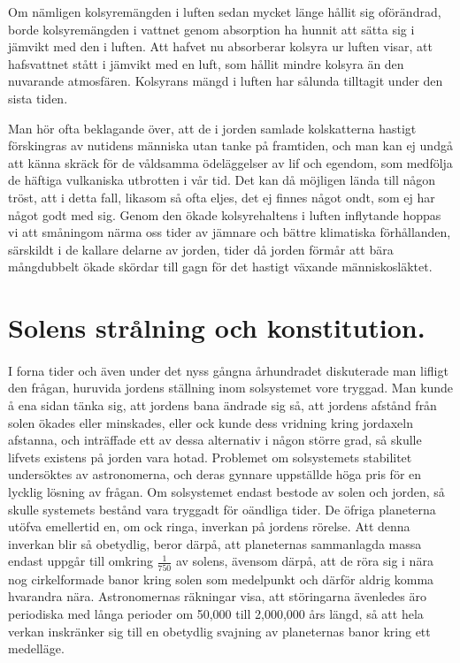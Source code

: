 \documentclass[a4paper, 12pt, oneside, swedish]{article}
\begin{document}
Om nämligen kolsyremängden i luften sedan mycket länge hållit sig oförändrad, borde kolsyremängden i vattnet genom absorption ha hunnit att sätta sig i jämvikt med den i luften. Att hafvet nu absorberar kolsyra ur luften visar, att hafsvattnet stått i jämvikt med en luft, som hållit mindre kolsyra än den nuvarande atmosfären. Kolsyrans mängd i luften har sålunda tilltagit under den sista tiden.

Man hör ofta beklagande över, att de i jorden samlade kolskatterna hastigt förskingras av nutidens människa utan tanke på framtiden, och man kan ej undgå att känna skräck för de våldsamma ödeläggelser av lif och egendom, som medfölja de häftiga vulkaniska utbrotten i vår tid. Det kan då möjligen lända till någon tröst, att i detta fall, likasom så ofta eljes, det ej finnes något ondt, som ej har något godt med sig. Genom den ökade kolsyrehaltens i luften inflytande hoppas vi att småningom närma oss tider av jämnare och bättre klimatiska förhållanden, särskildt i de kallare delarne av jorden, tider då jorden förmår att bära mångdubbelt ökade skördar till gagn för det hastigt växande människosläktet.
\clearpage
\section{Solens strålning och konstitution.}
\paragraph{}
I forna tider och även under det nyss gångna århundradet diskuterade man lifligt den frågan, huruvida jordens ställning inom solsystemet vore tryggad. Man kunde å ena sidan tänka sig, att jordens bana ändrade sig så, att jordens afstånd från solen ökades eller minskades, eller ock kunde dess vridning kring jordaxeln afstanna, och inträffade ett av dessa alternativ i någon större grad, så skulle lifvets existens på jorden vara hotad. Problemet om solsystemets stabilitet undersöktes av astronomerna, och deras gynnare uppställde höga pris för en lycklig lösning av frågan. Om solsystemet endast bestode av solen och jorden, så skulle systemets bestånd vara tryggadt för oändliga tider. De öfriga planeterna utöfva emellertid en, om ock ringa, inverkan på jordens rörelse. Att denna inverkan blir så obetydlig, beror därpå, att planeternas sammanlagda massa endast uppgår till omkring $\frac{1}{750}$ av solens, ävensom därpå, att de röra sig i nära nog cirkelformade banor kring solen som medelpunkt och därför aldrig komma hvarandra nära. Astronomernas räkningar visa, att störingarna ävenledes äro periodiska med långa perioder om 50,000 till 2,000,000 års längd, så att hela verkan inskränker sig till en obetydlig svajning av planeternas banor kring ett medelläge.
\end{document}
